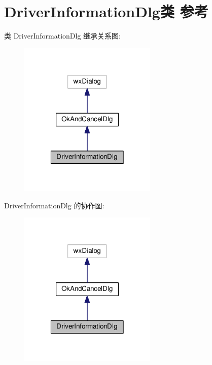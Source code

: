 \hypertarget{class_driver_information_dlg}{\section{Driver\+Information\+Dlg类 参考}
\label{class_driver_information_dlg}
}


类 Driver\+Information\+Dlg 继承关系图\+:
\nopagebreak
\begin{figure}[H]
\begin{center}
\leavevmode
\includegraphics[width=186pt]{class_driver_information_dlg__inherit__graph}
\end{center}
\end{figure}


Driver\+Information\+Dlg 的协作图\+:
\nopagebreak
\begin{figure}[H]
\begin{center}
\leavevmode
\includegraphics[width=186pt]{class_driver_information_dlg__coll__graph}
\end{center}
\end{figure}
